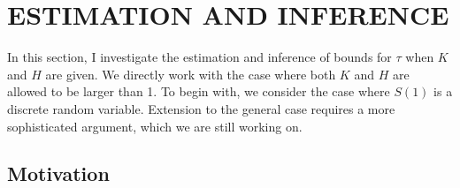 \documentclass[12pt]{article}
\newtheorem{rmk}{Remark}
\newcommand{\Indc}{\mathbb{I}}
\begin{document}
		

    \section{ESTIMATION AND INFERENCE}
	In this section, I investigate the estimation and inference of bounds for $\tau$ when $K$ and $H$ are given. We directly work with the case where both $K$ and $H$ are allowed to be larger than 1. To begin with, we consider the case where $S(1)$ is a discrete random variable. Extension to the general case requires a more sophisticated argument, which we are still working on.
	\subsection{Motivation}
	
\end{document}
